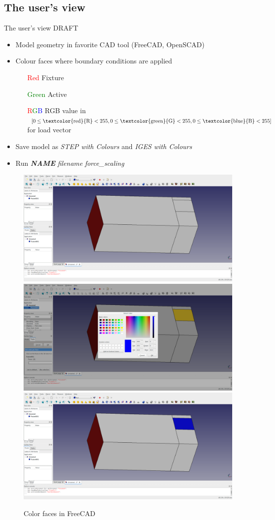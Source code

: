 \subsection{The user's view}
\begin{frame}{The user's view DRAFT}
\begin{itemize}
	\item Model geometry in favorite CAD tool (FreeCAD, OpenSCAD)
	\item Colour faces where boundary conditions are applied
	\begin{itemize}
		\item[\textcolor{red}{Red}] Fixture
		\item[\textcolor{green}{Green}] Active
		\item[\textcolor{red}{R}\textcolor{green}{G}\textcolor{blue}{B}] RGB value in $[0 \leq \text{\textcolor{red}{R}} < 255,0 \leq \text{\textcolor{green}{G}} < 255,0 \leq \text{\textcolor{blue}{B}} < 255]$ for load vector
	\end{itemize}
	\item Save model as \textit{STEP with Colours} and \textit{IGES with Colours}
	\item Run \textit{\textbf{NAME}} \textit{filename} \textit{force{\_}scaling}
\end{itemize}
\begin{figure}[htp]

\centering
\includegraphics[width=.3\textwidth]{Pictures/TopOp/CantileverFCAD1.png}\hfill
\includegraphics[width=.3\textwidth]{Pictures/TopOp/CantileverFCAD2.png}\hfill
\includegraphics[width=.3\textwidth]{Pictures/TopOp/CantileverFCAD3.png}

\caption{Color faces in FreeCAD}
\label{fig: FreeCADColoring}
\end{figure}
\end{frame}

